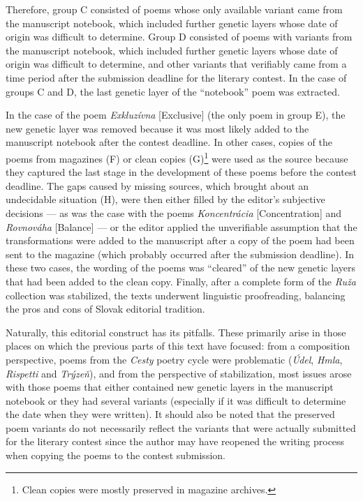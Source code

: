 \begin{paper}
Therefore, group C consisted of poems whose only available variant came from the manuscript notebook, which included further genetic layers whose date of origin was difficult to determine. Group D consisted of poems with variants from the manuscript notebook, which included further genetic layers whose date of origin was difficult to determine, and other variants that verifiably came from a time period after the submission deadline for the literary contest. In the case of groups C and D, the last genetic layer of the ``notebook'' poem was extracted.

In the case of the poem \emph{Exkluzívna} [Exclusive] (the only poem
in group E), the new genetic layer was removed because it was most
likely added to the manuscript notebook after the contest deadline. In
other cases, copies of the poems from magazines (F) or clean copies
(G)\footnote{Clean copies were mostly preserved in magazine archives.}
were used as the source because they captured the last stage in the
development of these poems before the contest deadline. The gaps caused
by missing sources, which brought about an undecidable situation (H),
were then either filled by the editor's subjective decisions –– as was
the case with the poems \emph{Koncentrácia} [Concentration]
and \emph{Rovnováha} [Balance] –– or the editor applied the unverifiable
assumption that the transformations were added to the manuscript after
a copy of the poem had been sent to the magazine (which probably
occurred after the submission deadline). In these two cases, the wording
of the poems was ``cleared'' of the new genetic layers that had been
added to the clean copy. Finally, after a complete form of the
\emph{Ruža} collection was stabilized, the texts underwent linguistic
proofreading, balancing the pros and cons of Slovak editorial tradition.

Naturally, this editorial construct has its pitfalls. These primarily
arise in those places on which the previous parts of this text have
focused: from a composition perspective, poems from the \emph{Cesty}
poetry cycle were problematic (\emph{Údel}, \emph{Hmla}, \emph{Rispetti}
and \emph{Trýzeň}), and from the perspective of stabilization, most
issues arose with those poems that either contained new genetic layers
in the manuscript notebook or they had several variants (especially if
it was difficult to determine the date when they were written). It
should also be noted that the preserved poem variants do not necessarily
reflect the variants that were actually submitted for the literary
contest since the author may have reopened the writing process when
copying the poems to the contest submission.


\end{paper}
